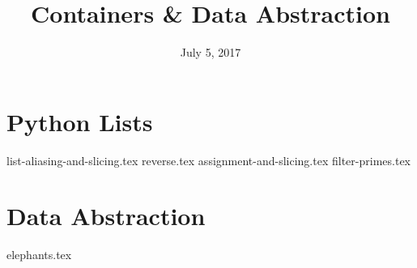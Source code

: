 \documentclass{exam}
\title{Containers \& Data Abstraction}
\date{July 5, 2017}
\begin{document}
\maketitle

\section{Python Lists}
\begin{questions}
{list-aliasing-and-slicing.tex}
{reverse.tex}
\clearpage
{assignment-and-slicing.tex}
{filter-primes.tex}
\end{questions}

\clearpage

\section{Data Abstraction}
\begin{questions}
{elephants.tex}
\end{questions}
\end{document}
